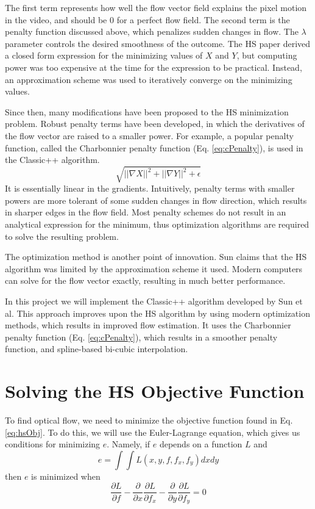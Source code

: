 \documentclass[10pt,twocolumn,letterpaper]{article}
\begin{document}
The first term represents how well the flow vector field explains the pixel motion in the video, and should be 0 for a perfect flow field. The second term is the penalty function discussed above, which penalizes sudden changes in flow. The $\lambda$ parameter controls the desired smoothness of the outcome. The HS paper derived a closed form expression for the minimizing values of $X$ and $Y$, but computing power was too expensive at the time for the expression to be practical. Instead, an approximation scheme was used to iteratively converge on the minimizing values.

Since then, many modifications have been proposed to the HS minimization problem. Robust penalty terms have been developed, in which the derivatives of the flow vector are raised to a smaller power. For example, a popular penalty function, called the Charbonnier penalty function (Eq. \ref{eq:cPenalty}), is used in the Classic++ algorithm.
\begin{equation} \label{eq:cPenalty}
\sqrt{|| \nabla X ||^2 + || \nabla Y ||^2 + \epsilon}
\end{equation}
It is essentially linear in the gradients. Intuitively, penalty terms with smaller powers are more tolerant of some sudden changes in flow direction, which results in sharper edges in the flow field. Most penalty schemes do not result in an analytical expression for the minimum, thus optimization algorithms are required to solve the resulting problem.

The optimization method is another point of innovation. Sun \cite{sun} claims that the HS algorithm was limited by the approximation scheme it used. Modern computers can solve for the flow vector exactly, resulting in much better performance.

In this project we will implement the Classic++ algorithm developed by Sun et al. This approach improves upon the HS algorithm by using modern optimization methods, which results in improved flow estimation. It uses the Charbonnier penalty function (Eq. \ref{eq:cPenalty}), which results in a smoother penalty function, and spline-based bi-cubic interpolation.

\section{Solving the HS Objective Function}

To find optical flow, we need to minimize the objective function found in Eq. \ref{eq:hsObj}.  To do this, we will use the Euler-Lagrange equation, which gives us conditions for minimizing $e$.  Namely, if $e$ depends on a function $L$ and
\begin{equation} \label{eq:eulerL}
e = \int \int L(x, y, f, f_x, f_y) dxdy
\end{equation}
then $e$ is minimized when 
\begin{equation} \label{eq:eulerCondition}
\frac{\partial L}{\partial f} - \frac{\partial}{\partial x} \frac{\partial L}{\partial f_x} - \frac{\partial}{\partial y} \frac{\partial L}{\partial f_y} = 0
\end{equation}
\end{document}
